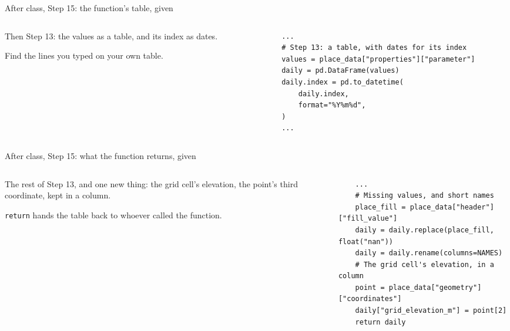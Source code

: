 \documentclass[9pt,aspectratio=169]{beamer}
\begin{document}
\begin{frame}[fragile]{After class, Step 15: the function's table, given}
    \begin{columns}[T]
        \begin{column}{0.37\textwidth}
            Then Step 13: the values as a table, and its index as dates.

            \medskip
            Find the lines you typed on your own table.
        \end{column}
        \begin{column}{0.6\textwidth}
\begin{lstlisting}
    ...
    # Step 13: a table, with dates for its index
    values = place_data["properties"]["parameter"]
    daily = pd.DataFrame(values)
    daily.index = pd.to_datetime(
        daily.index,
        format="%Y%m%d",
    )
    ...
\end{lstlisting}
        \end{column}
    \end{columns}
\end{frame}

\begin{frame}[fragile]{After class, Step 15: what the function returns, given}
    \begin{columns}[T]
        \begin{column}{0.37\textwidth}
            The rest of Step 13, and one new thing: the grid cell's elevation, the point's third coordinate, kept in a column.

            \medskip
            \texttt{return} hands the table back to whoever called the function.
        \end{column}
        \begin{column}{0.6\textwidth}
\begin{lstlisting}
    ...
    # Missing values, and short names
    place_fill = place_data["header"]["fill_value"]
    daily = daily.replace(place_fill, float("nan"))
    daily = daily.rename(columns=NAMES)
    # The grid cell's elevation, in a column
    point = place_data["geometry"]["coordinates"]
    daily["grid_elevation_m"] = point[2]
    return daily
\end{lstlisting}
        \end{column}
    \end{columns}
\end{frame}
\end{document}
